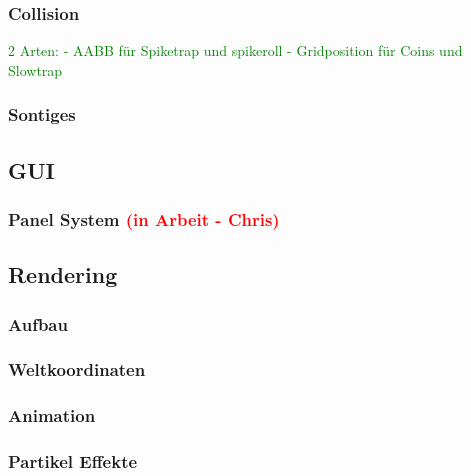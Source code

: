 \documentclass{article}
\begin{document}
\vspace{1cm}
\subsubsection{Collision}
\textcolor{green}{2 Arten: \newline
- AABB für Spiketrap und spikeroll \newline
- Gridposition für Coins und Slowtrap}

\vspace{1cm}
\subsubsection{Sontiges}

\vspace{2cm}
\subsection{GUI}

\vspace{1cm}
\subsubsection{Panel System \textcolor{red}{(in Arbeit - Chris)}}

\vspace{2cm}
\subsection{Rendering}

\vspace{1cm}
\subsubsection{Aufbau}

\vspace{1cm}
\subsubsection{Weltkoordinaten}

\vspace{1cm}
\subsubsection{Animation}

\vspace{1cm}
\subsubsection{Partikel Effekte}
\end{document}
